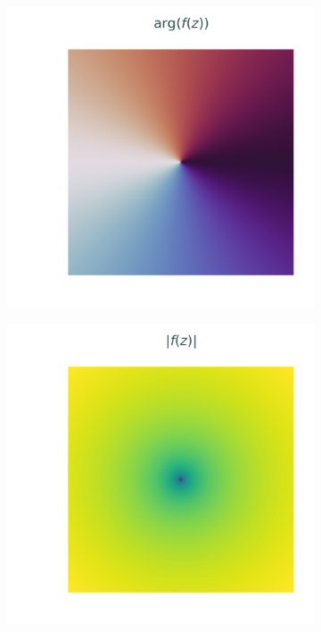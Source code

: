 \begin{figure}[H] %
\captionsetup[subfigure]{justification=centering}
\centering
\begin{subfigure}{.49\textwidth}
    \centering
    \includegraphics[width=\textwidth]{figures/identity_angle.png}
\end{subfigure}
%
\begin{subfigure}{.49\textwidth}
    \centering
    \includegraphics[width=\textwidth]{figures/identity_magnitude.png}

\end{subfigure}
\end{figure}
